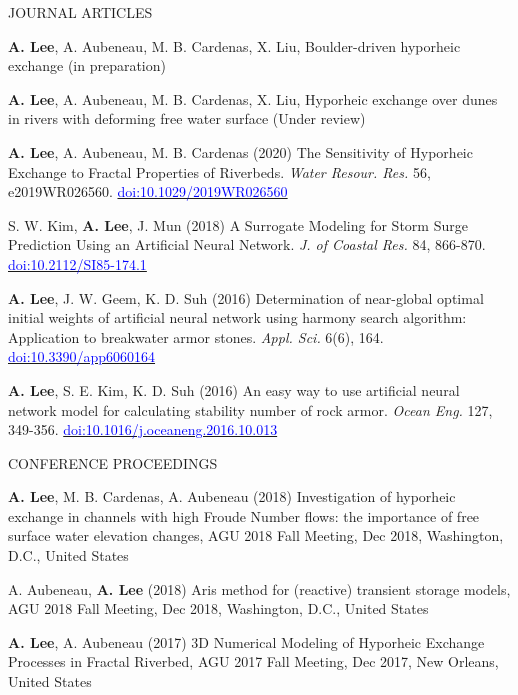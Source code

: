 \documentclass{resume_anzy} %
\begin{document}
\begin{rSection}{JOURNAL ARTICLES}
\vspace{-2.5mm}
\item \textbf{A. Lee}, A. Aubeneau, M. B. Cardenas, X. Liu, Boulder-driven hyporheic exchange (in preparation)
\item \textbf{A. Lee}, A. Aubeneau, M. B. Cardenas, X. Liu, Hyporheic exchange over dunes in rivers with deforming free water surface (Under review)
\item \textbf{A. Lee}, A. Aubeneau, M. B. Cardenas (2020) The Sensitivity of Hyporheic Exchange to Fractal Properties of Riverbeds. \textit{Water Resour. Res.} 56, e2019WR026560. \href{https://doi.org/10.1029/2019WR026560}{\textcolor{blue}{doi:10.1029/2019WR026560}}
\item S. W. Kim, \textbf{A. Lee}, J. Mun (2018) A Surrogate Modeling for Storm Surge Prediction Using an Artificial Neural Network. \textit{J. of Coastal Res.} 84, 866-870. \href{https://doi.org/10.2112/SI85-174.1}{\textcolor{blue}{doi:10.2112/SI85-174.1}}
\item \textbf{A. Lee}, J. W. Geem, K. D. Suh (2016) Determination of near-global optimal initial weights of artificial neural network using harmony search algorithm: Application to breakwater armor stones. \textit{Appl. Sci.} 6(6), 164. \href{https://doi.org/10.3390/app6060164}{\textcolor{blue}{doi:10.3390/app6060164}}
\item \textbf{A. Lee}, S. E. Kim, K. D. Suh (2016) An easy way to use artificial neural network model for calculating stability number of rock armor. \textit{Ocean Eng.} 127, 349-356.  \href{https://doi.org/10.1016/j.oceaneng.2016.10.013}{\textcolor{blue}{doi:10.1016/j.oceaneng.2016.10.013}}
\end{rSection}

\begin{rSection}{CONFERENCE PROCEEDINGS}
\vspace{-2.5mm}
\item \textbf{A. Lee}, M. B. Cardenas, A. Aubeneau (2018) Investigation of hyporheic exchange in channels with high Froude Number flows: the importance of free surface water elevation changes, AGU 2018 Fall Meeting, Dec 2018, Washington, D.C., United States 
\item A. Aubeneau, \textbf{A. Lee}  (2018) Aris method for (reactive) transient storage models, AGU 2018 Fall Meeting, Dec 2018, Washington, D.C., United States 
\item \textbf{A. Lee}, A. Aubeneau (2017) 3D Numerical Modeling of Hyporheic Exchange Processes in Fractal Riverbed, AGU 2017 Fall Meeting, Dec 2017, New Orleans, United States 
\end{rSection}
\end{document}
